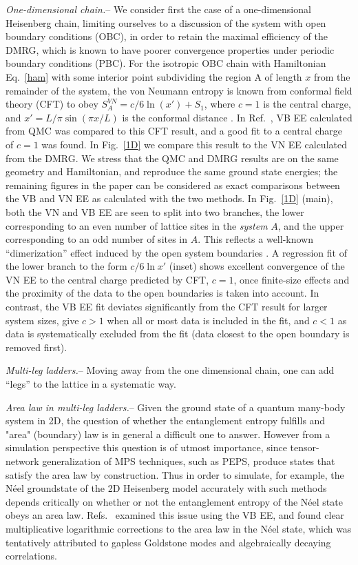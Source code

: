 \documentclass[prl,aps,twocolumn,floatfix,amsmath,amssymb,superscriptaddress,tightenlines]{revtex4}
\begin{document}
{\it One-dimensional chain.}-- We consider first the case of a one-dimensional Heisenberg chain, limiting ourselves to a discussion of the system with open boundary conditions (OBC), in order to retain the maximal efficiency of the DMRG, which is known to have poorer convergence properties under periodic boundary conditions (PBC).  For the isotropic OBC chain with Hamiltonian Eq.~\eqref{ham} with some interior point subdividing the region A of length $x$ from the remainder of the system, the von Neumann entropy is known from conformal field theory (CFT) to obey $S^{VN}_A = c/6 \ln(x') + S_1$, where $c=1$ is the central charge, and $x'=L/\pi \sin(\pi x / L)$ is the conformal distance \cite{Cardy}.
In Ref.~\cite{Alet}, VB EE calculated from QMC was compared to this CFT result, and a good fit to a central charge of $c=1$ was found.  In Fig.~\ref{1D} we compare this result to the VN EE calculated from the DMRG.  We stress that the QMC and DMRG results are on the same geometry and Hamiltonian, and reproduce the same ground state energies; the remaining figures in the paper can be considered as exact comparisons between the VB and VN EE as calculated with the two methods.  In Fig.~\ref{1D} (main), both the VN and VB EE are seen to split into two branches, the lower corresponding to an even number of lattice sites in the {\it system} $A$, and the upper corresponding to an odd number of sites in $A$.  This reflects a well-known ``dimerization'' effect induced by the open system boundaries \cite{Ian1}.  A regression fit of the lower branch to the form $c/6 \ln {x'}$ (inset) shows excellent convergence of the VN EE to the central charge predicted by CFT, $c=1$, once finite-size effects and the proximity of the data to the open boundaries is taken into account.  In contrast, the VB EE fit deviates significantly from the CFT result for larger system sizes, give $c>1$ when all or most data is included in the fit, and $c<1$ as data is systematically excluded from the fit (data closest to the open boundary is removed first).  

{\it Multi-leg ladders.}-- Moving away from the one dimensional chain, one can add ``legs'' to the lattice in a systematic way.

{\it Area law in multi-leg ladders.}--  Given the ground state of a quantum many-body system in 2D, the question of whether the entanglement entropy fulfills and "area" (boundary) law is in general a difficult one to answer.  
However from a simulation perspective this question is of utmost importance, since tensor-network generalization of MPS techniques, such as PEPS, produce states that satisfy the area law by construction.  Thus in order to simulate, for example, the N\'eel groundstate of the 2D Heisenberg model accurately with such methods depends critically on whether or not the entanglement entropy of the N\'eel state obeys an area law.  Refs.~\cite{Alet,Chh} examined this issue using the VB EE, and found clear multiplicative logarithmic corrections to the area law in the N\'eel state, which was tentatively attributed to gapless Goldstone modes and algebraically decaying correlations.  
\end{document}
